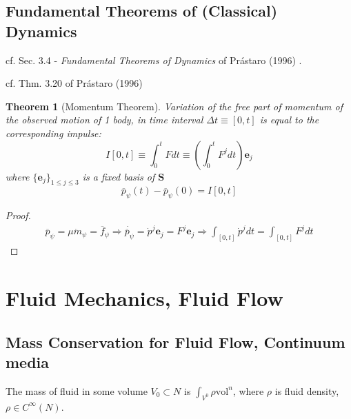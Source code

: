 \documentclass[10pt]{amsart}
\newtheorem{theorem}{Theorem}
\begin{document}
\begin{multicols*}{2}
\subsection{Fundamental Theorems of (Classical) Dynamics}

cf. Sec. 3.4 - \emph{Fundamental Theorems of Dynamics} of Pr\'{a}staro (1996) \cite{Pras1996}.

cf. Thm. 3.20 of Pr\'{a}staro (1996) \cite{Pras1996}
\begin{theorem}[Momentum Theorem]
	Variation of the free part of momentum of the observed motion of 1 body, in time interval $\Delta t \equiv [0, t]$ is equal to the corresponding impulse:
	\begin{equation}
	I[0,t] \equiv \int_0^t Fdt \equiv \left( \int_0^t F^j dt \right) \mathbf{e}_j
	\end{equation}
	where $\lbrace \mathbf{e}_j \rbrace_{1 \leq j \leq 3}$ is a fixed basis of $\mathbf{S}$
	\begin{equation}
		\overline{p}_{\psi}(t) - \overline{p}_{\psi}(0) = I[0,t]
	\end{equation}
\end{theorem}

\begin{proof}
	\[
\begin{gathered}
\overline{p}_{\psi} = \mu \ddot{m}_{\psi} = \overline{f}_{\psi} \Longrightarrow \dot{ \overline{p}_{\psi}} = \dot{p}^j \mathbf{e}_j = F^j \textbf{e}_j \Longrightarrow \int_{[0,t]} \dot{p}^j dt = \int_{[0,t]}F^j dt
\end{gathered}
	\]
	\end{proof}

\section{Fluid Mechanics, Fluid Flow}

\subsection{Mass Conservation for Fluid Flow, Continuum media}

The mass of fluid in some volume $V_0 \subset N$ is $\int_{V^0} \rho \text{vol}^n$, where $\rho$ is fluid density, $\rho \in C^{\infty}(N)$.  


\end{multicols*}
\end{document}
